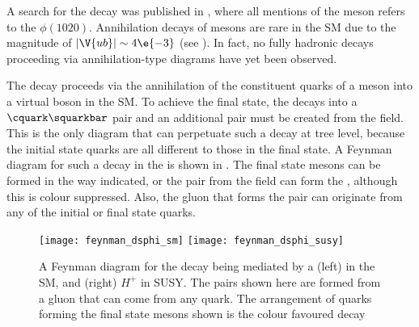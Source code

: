A search for the decay \btodsphi was published in , where all mentions of
the \phii meson refers to the $\phi(1020)$.
Annihilation decays of \Bp mesons are rare in the SM due to the magnitude of
$|\V{ub}|\sim4\e{-3}$ (see ).
In fact, no fully hadronic decays proceeding via annihilation-type diagrams have yet been
observed.

The decay \btodsphi proceeds via the annihilation of the constituent quarks of a \Bp meson
into a virtual \Wp boson in the SM.
To achieve the final state, the \Wp decays into a $\cquark\squarkbar$ pair and an additional
\ssbar pair must be created from the \QCD field.
This is the only diagram that can perpetuate such a decay at tree level, because the initial state
quarks are all different to those in the final state.
A Feynman diagram for such a decay in the \sm
is shown in .
The final state mesons can be formed in the way indicated, or the \ssbar pair from the \QCD field
can form the \phii, although this is colour suppressed.
Also, the gluon that forms the \ssbar pair can originate from any of the initial or final state
quarks.

\begin{figure}
  \begin{center}
    \texttt{[image: feynman\_dsphi\_sm]}
    \texttt{[image: feynman\_dsphi\_susy]}
    \caption[Feynman diagram for the decay \btodsphi]
    {
      A Feynman diagram for the decay \btodsphi being mediated by a
      (left) \Wp in the SM, and
      (right) $H^+$ in SUSY.
      The \ssbar pairs shown here are formed from a gluon that can come from any quark.
      The arrangement of quarks forming the final state mesons shown is the colour favoured decay
    }
    \label{fig:dsphi:feyn}
  \end{center}
\end{figure}



